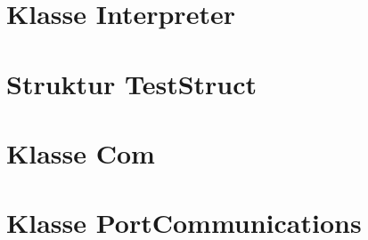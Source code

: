 \section{Klasse Interpreter}
\paragraph{}

\subsection{}





\section{Struktur TestStruct}
\paragraph{}

\subsection{}






\section{Klasse Com}
\paragraph{}

\subsection{}


\section{Klasse PortCommunications}
\paragraph{}

\subsection{}



